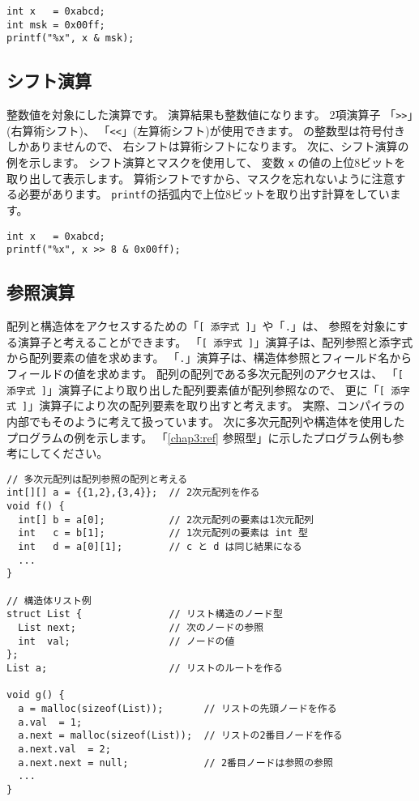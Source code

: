 \begin{mylist}
\begin{verbatim}
int x   = 0xabcd;
int msk = 0x00ff;
printf("%x", x & msk);
\end{verbatim}
\end{mylist}

\subsection{シフト演算}

整数値を対象にした演算です。
演算結果も整数値になります。
2項演算子
「\verb/>>/」(右算術シフト)、
「\verb/<</」(左算術シフト)が使用できます。
\cmml の整数型は符号付きしかありませんので、
右シフトは算術シフトになります。
次に、シフト演算の例を示します。
シフト演算とマスクを使用して、
変数 \verb/x/ の値の上位8ビットを取り出して表示します。
算術シフトですから、マスクを忘れないように注意する必要があります。
\verb/printf/の括弧内で上位8ビットを取り出す計算をしています。

\begin{mylist}
\begin{verbatim}
int x   = 0xabcd;
printf("%x", x >> 8 & 0x00ff);
\end{verbatim}
\end{mylist}

\subsection{参照演算}

配列と構造体をアクセスするための「\verb/[ 添字式 ]/」や「\verb/./」は、
参照を対象にする演算子と考えることができます。
「\verb/[ 添字式 ]/」演算子は、配列参照と添字式から配列要素の値を求めます。
「\verb/./」演算子は、構造体参照とフィールド名からフィールドの値を求めます。
配列の配列である多次元配列のアクセスは、
「\verb/[ 添字式 ]/」演算子により取り出した配列要素値が配列参照なので、
更に「\verb/[ 添字式 ]/」演算子により次の配列要素を取り出すと考えます。
実際、\cmm コンパイラの内部でもそのように考えて扱っています。
次に多次元配列や構造体を使用したプログラムの例を示します。
「\ref{chap3:ref} 参照型」に示したプログラム例も参考にしてください。

\begin{mylist}
\begin{verbatim}
// 多次元配列は配列参照の配列と考える
int[][] a = {{1,2},{3,4}};  // 2次元配列を作る
void f() {
  int[] b = a[0];           // 2次元配列の要素は1次元配列
  int   c = b[1];           // 1次元配列の要素は int 型
  int   d = a[0][1];        // c と d は同じ結果になる
  ...
}

// 構造体リスト例
struct List {               // リスト構造のノード型
  List next;                // 次のノードの参照
  int  val;                 // ノードの値
};
List a;                     // リストのルートを作る

void g() {
  a = malloc(sizeof(List));       // リストの先頭ノードを作る
  a.val  = 1;
  a.next = malloc(sizeof(List));  // リストの2番目ノードを作る
  a.next.val  = 2;
  a.next.next = null;             // 2番目ノードは参照の参照
  ...
}
\end{verbatim}
\end{mylist}

